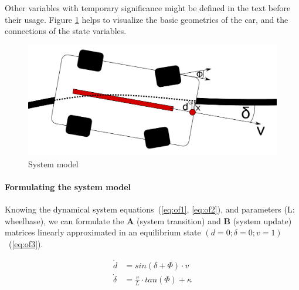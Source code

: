 Other variables with temporary significance might be defined in the text before their usage. Figure \ref{fig:cartop} helps to visualize the basic geometrics of the car, and the connections of the state variables.

\begin{figure}[!ht]
    \centering
    \includegraphics[width=0.7\linewidth]{img/cartop}
    \caption{System model}
    \label{fig:cartop}
\end{figure}

\paragraph{Formulating the system model}

Knowing the dynamical system equations~(\ref{eq:of1}, \ref{eq:of2}), and parameters (L: wheelbase), we can formulate the \textbf{A} (system transition) and \textbf{B} (system update) matrices linearly approximated in an equilibrium state $(d = 0; \delta = 0; v = 1)$ ~(\ref{eq:of3}).

\begin{align} 
    \dot{d} &= sin(\delta + \Phi) \cdot v  \label{eq:of1} \\ 
    \dot{\delta} &= \frac{v}{L} \cdot tan(\Phi) + \kappa \label{eq:of2}
\end{align}


